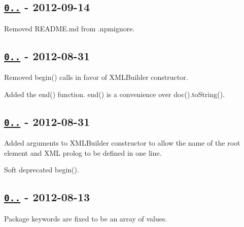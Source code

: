 \subsection*{\href{https://github.com/oozcitak/xmlbuilder-js/compare/v0.4.1...v0.4.2}{\tt 0..} -\/ 2012-\/09-\/14}


\begin{DoxyItemize}
\item Removed R\+E\+A\+D\+M\+E.\+md from {\ttfamily .npmignore}.
\end{DoxyItemize}

\subsection*{\href{https://github.com/oozcitak/xmlbuilder-js/compare/v0.4.0...v0.4.1}{\tt 0..} -\/ 2012-\/08-\/31}


\begin{DoxyItemize}
\item Removed {\ttfamily begin()} calls in favor of {\ttfamily X\+M\+L\+Builder} constructor.
\item Added the {\ttfamily end()} function. {\ttfamily end()} is a convenience over {\ttfamily doc().to\+String()}.
\end{DoxyItemize}

\subsection*{\href{https://github.com/oozcitak/xmlbuilder-js/compare/v0.3.11...v0.4.0}{\tt 0..} -\/ 2012-\/08-\/31}


\begin{DoxyItemize}
\item Added arguments to {\ttfamily X\+M\+L\+Builder} constructor to allow the name of the root element and X\+ML prolog to be defined in one line.
\item Soft deprecated {\ttfamily begin()}.
\end{DoxyItemize}

\subsection*{\href{https://github.com/oozcitak/xmlbuilder-js/compare/v0.3.10...v0.3.11}{\tt 0..} -\/ 2012-\/08-\/13}


\begin{DoxyItemize}
\item Package keywords are fixed to be an array of values.
\end{DoxyItemize}

